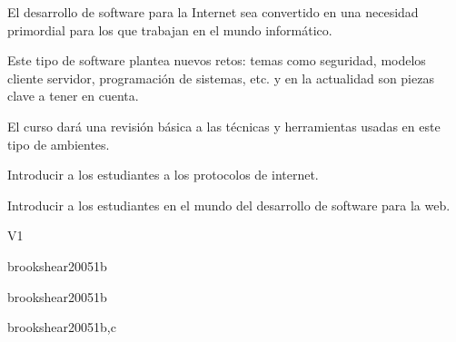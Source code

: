 \begin{syllabus}


\begin{justification}
El desarrollo de software para la Internet sea convertido en una necesidad primordial para los que trabajan en el mundo informático.

Este tipo de software plantea nuevos retos: temas como seguridad, modelos cliente servidor, programación de sistemas, etc. y en la actualidad son piezas clave a tener en cuenta.

El curso dará una revisión básica a las técnicas y herramientas usadas en este tipo de ambientes.
\end{justification}

\begin{goals}
\item Introducir a los estudiantes a los protocolos de internet.
\item Introducir a los estudiantes en el mundo del desarrollo de software para la web.
\end{goals}

\begin{outcomes}{V1}
   \item {}
   \item {}
   \item {}
   \item {}
   \item {}
\end{outcomes}

\begin{unit}{\NCIntroduction}{}{brookshear2005}{1}{b}
   \NCIntroductionAllTopics
   \NCIntroductionAllLearningOutcomes
\end{unit}

\begin{unit}{\NCNetworkedApplications}{}{brookshear2005}{1}{b}
   \NCNetworkedApplicationsAllTopics
   \NCNetworkedApplicationsAllLearningOutcomes
\end{unit}

\begin{unit}{\OSSecurityandProtection}{}{brookshear2005}{1}{b,c}
   \OSSecurityandProtectionAllTopics
   \OSSecurityandProtectionAllLearningOutcomes
\end{unit}


\end{syllabus}
